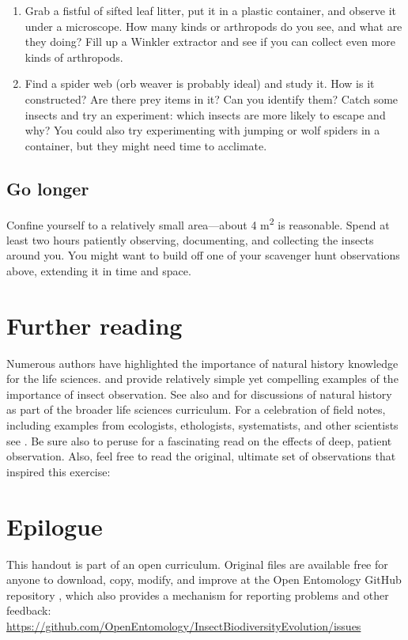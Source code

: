 \documentclass[letterpaper, 11pt]{article}
\begin{document}
\begin{enumerate}
\item Grab a fistful of sifted leaf litter, put it in a plastic container, and observe it under a microscope. How many kinds or arthropods do you see, and what are they doing? Fill up a Winkler extractor and see if you can collect even more kinds of arthropods.
\item Find a spider web (orb weaver is probably ideal) and study it. How is it constructed? Are there prey items in it? Can you identify them? Catch some insects and try an experiment: which insects are more likely to escape and why? You could also try experimenting with jumping or wolf spiders in a container, but they might need time to acclimate.%
\end{enumerate}

\subsection*{Go longer}
Confine yourself to a relatively small area---about 4 m\textsuperscript{2} is reasonable. Spend at least two hours patiently observing, documenting, and collecting the insects around you. You might want to build off one of your scavenger hunt observations above, extending it in time and space.

\section*{Further reading}
Numerous authors have highlighted the importance of natural history knowledge for the life sciences. \cite{agrawal2014} and \cite{wilcoveeisner2000} provide relatively simple yet compelling examples of the importance of insect observation. See also \cite{Schmidly449} and \cite{Barrows13042016} for discussions of natural history as part of the broader life sciences curriculum. For a celebration of field notes, including examples from ecologists, ethologists, systematists, and other scientists see \cite{canfield2011field}. Be sure also to peruse \cite{roberts2013} for a fascinating read on the effects of deep, patient observation. Also, feel free to read the original, ultimate set of observations that inspired this exercise: \cite{Darwin1859}

\section*{Epilogue}
This handout is part of an open curriculum. Original files are available free for anyone to download, copy, modify, and improve at the Open Entomology GitHub repository \citep{ENT432}, which also provides a mechanism for reporting problems and other feedback:\\
\url{https://github.com/OpenEntomology/InsectBiodiversityEvolution/issues}



\end{document}
